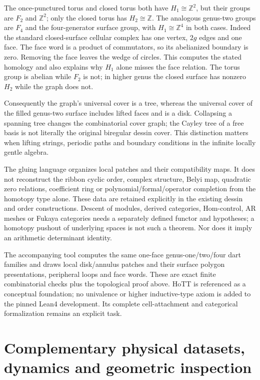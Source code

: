 \documentclass[11pt,oneside,openany]{book}
\theoremstyle{definition}\newtheorem{definition}[theorem]{Definition}
\theoremstyle{remark}\newtheorem{remark}[theorem]{Remark}
\begin{document}
The once-punctured torus and closed torus both have $H_1\cong\mathbb Z^2$,
but their groups are $F_2$ and $\mathbb Z^2$; only the closed torus has
$H_2\cong\mathbb Z$. The analogous genus-two groups are $F_4$ and the
four-generator surface group, with $H_1\cong\mathbb Z^4$ in both cases.
Indeed the standard closed-surface cellular complex has one vertex,
$2g$ edges and one face. The face word is a product of commutators, so its
abelianized boundary is zero. Removing the face leaves the wedge of circles.
This computes the stated homology and also explains why $H_1$ alone misses
the face relation. The torus group is abelian while $F_2$ is not; in higher
genus the closed surface has nonzero $H_2$ while the graph does not.

Consequently the graph's universal cover is a tree, whereas the universal
cover of the filled genus-two surface includes lifted faces and is a disk.
Collapsing a spanning tree changes the combinatorial cover graph; the Cayley
tree of a free basis is not literally the original biregular dessin cover.
This distinction matters when lifting strings, periodic paths and boundary
conditions in the infinite locally gentle algebra.

The gluing language organizes local patches and their compatibility maps.
It does not reconstruct the ribbon cyclic order, complex structure, Belyi
map, quadratic zero relations, coefficient ring or polynomial/formal/operator
completion from the homotopy type alone. These data are retained explicitly
in the existing dessin and order constructions. Descent of modules, derived
categories, Hom-control, AR meshes or Fukaya categories needs a separately
defined functor and hypotheses; a homotopy pushout of underlying spaces is
not such a theorem. Nor does it imply an arithmetic determinant identity.

The accompanying tool computes the same one-face genus-one/two/four dart
families and draws local disk/annulus patches and their surface polygon
presentations, peripheral loops and face words. These
are exact finite combinatorial checks plus the topological proof above.
HoTT is referenced as a conceptual foundation; no univalence or higher
inductive-type axiom is added to the pinned Lean4 development. Its complete
cell-attachment and categorical formalization remains an explicit task.


\chapter{Complementary physical datasets, dynamics and geometric inspection}
\end{document}
